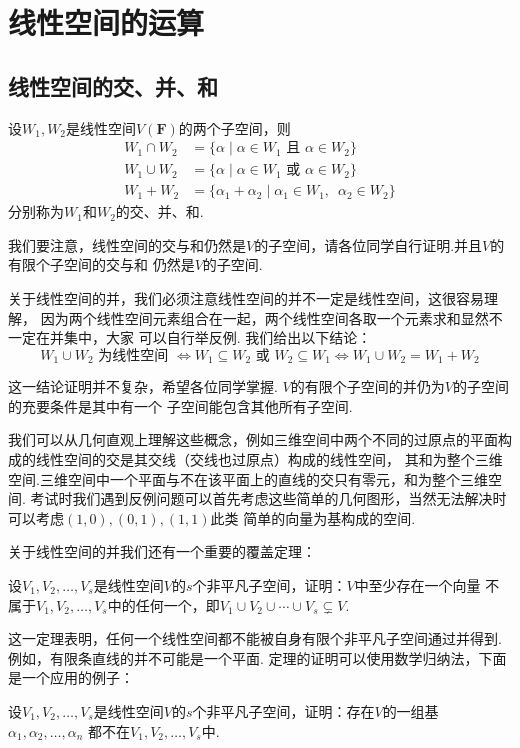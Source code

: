 \chapter{线性空间的运算}

\section{线性空间的交、并、和}
\begin{definition}
    设$W_1,W_2$是线性空间$V(\mathbf{F})$的两个子空间，则
    \begin{align*}
    W_1 \cap W_2&=\{\alpha \mid \alpha\in W_1 \text{ 且 } \alpha\in W_2\} \\
    W_1 \cup W_2&=\{\alpha \mid \alpha\in W_1 \text{ 或 } \alpha\in W_2\} \\
    W_1 + W_2&=\{\alpha_1+\alpha_2 \mid \alpha_1\in W_1,\enspace\alpha_2\in W_2\}
    \end{align*}
    分别称为$W_1$和$W_2$的交、并、和.
\end{definition}
我们要注意，线性空间的交与和仍然是$V$的子空间，请各位同学自行证明.并且$V$的有限个子空间的交与和
仍然是$V$的子空间.

关于线性空间的并，我们必须注意线性空间的并不一定是线性空间，这很容易理解，
因为两个线性空间元素组合在一起，两个线性空间各取一个元素求和显然不一定在并集中，大家
可以自行举反例. 我们给出以下结论：
\[ W_1 \cup W_2 \text{ 为线性空间 } \iff W_1 \subseteq W_2 \text{ 或 } W_2 \subseteq W_1 \iff W_1 \cup W_2=W_1+W_2 \]

这一结论证明并不复杂，希望各位同学掌握. $V$的有限个子空间的并仍为$V$的子空间的充要条件是其中有一个
子空间能包含其他所有子空间.

我们可以从几何直观上理解这些概念，例如三维空间中两个不同的过原点的平面构成的线性空间的交是其交线（交线也过原点）构成的线性空间，
其和为整个三维空间.三维空间中一个平面与不在该平面上的直线的交只有零元，和为整个三维空间.
考试时我们遇到反例问题可以首先考虑这些简单的几何图形，当然无法解决时可以考虑$(1,0),(0,1),(1,1)$此类
简单的向量为基构成的空间.

关于线性空间的并我们还有一个重要的覆盖定理：
\begin{theorem}
    设$V_1,V_2,\ldots,V_s$是线性空间$V$的$s$个非平凡子空间，证明：$V$中至少存在一个向量
    不属于$V_1,V_2,\ldots,V_s$中的任何一个，即$V_1 \cup V_2 \cup \cdots \cup V_s\subsetneq V.$
\end{theorem}
这一定理表明，任何一个线性空间都不能被自身有限个非平凡子空间通过并得到.例如，有限条直线的并不可能是一个平面.
定理的证明可以使用数学归纳法，下面是一个应用的例子：
\begin{example}
    设$V_1,V_2,\ldots,V_s$是线性空间$V$的$s$个非平凡子空间，证明：存在$V$的一组基$\alpha_1,\alpha_2,\ldots,\alpha_n$
    都不在$V_1,V_2,\ldots,V_s$中.
\end{example}


